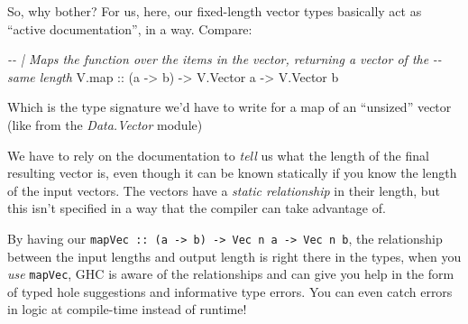 \documentclass[]{article}
\newenvironment{Shaded}{}{}
\newcommand{\CommentTok}[1]{\textcolor[rgb]{0.38,0.63,0.69}{\textit{#1}}}
\newcommand{\DataTypeTok}[1]{\textcolor[rgb]{0.56,0.13,0.00}{#1}}
\newcommand{\NormalTok}[1]{#1}
\newcommand{\OtherTok}[1]{\textcolor[rgb]{0.00,0.44,0.13}{#1}}
\begin{document}
So, why bother? For us, here, our fixed-length vector types basically act as
``active documentation'', in a way. Compare:

\begin{Shaded}
\begin{Highlighting}[]
\CommentTok{{-}{-} | Maps the function over the items in the vector, returning a vector of the}
\CommentTok{{-}{-} same length}
\NormalTok{V.map}\OtherTok{ ::}\NormalTok{ (a }\OtherTok{{-}>}\NormalTok{ b) }\OtherTok{{-}>} \DataTypeTok{V.Vector}\NormalTok{ a }\OtherTok{{-}>} \DataTypeTok{V.Vector}\NormalTok{ b}
\end{Highlighting}
\end{Shaded}

Which is the type signature we'd have to write for a map of an ``unsized''
vector (like from the \emph{Data.Vector} module)

We have to rely on the documentation to \emph{tell} us what the length of the
final resulting vector is, even though it can be known statically if you know
the length of the input vectors. The vectors have a \emph{static relationship}
in their length, but this isn't specified in a way that the compiler can take
advantage of.

By having our
\texttt{mapVec\ ::\ (a\ -\textgreater{}\ b)\ -\textgreater{}\ Vec\ n\ a\ -\textgreater{}\ Vec\ n\ b},
the relationship between the input lengths and output length is right there in
the types, when you \emph{use} \texttt{mapVec}, GHC is aware of the
relationships and can give you help in the form of typed hole suggestions and
informative type errors. You can even catch errors in logic at compile-time
instead of runtime!
\end{document}
